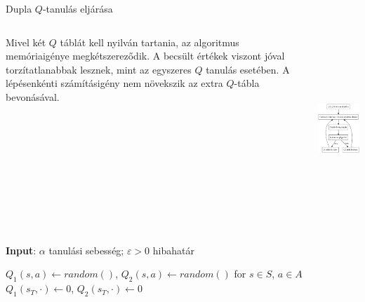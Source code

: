 \documentclass[english, aspectratio=169]{beamer}
\begin{document}
\begin{frame}{Dupla $Q$-tanulás eljárása}
\begin{columns}
\begin{column}{.5\textwidth}
Mivel két $Q$ táblát kell nyilván tartania, az algoritmus memóriaigénye megkétszereződik. A becsült értékek viszont jóval torzítatlanabbak lesznek, mint az egyszeres $Q$ tanulás esetében. A lépésenkénti számításigény nem növekszik az extra $Q$-tábla bevonásával.
\end{column}
\begin{column}{.5\textwidth}
\begin{center}
\includegraphics[height=7cm, keepaspectratio]{graphs/ql_2.png}
\end{center}
\end{column}
\end{columns}
\end{frame}

\begin{frame}{}
\begin{algorithm}[H]
\caption{Dupla $Q$-tanulás algoritmusa}
\SetAlgoLined
\begin{small}
\textbf{Input}: $\alpha$ tanulási sebesség; $\varepsilon > 0$ hibahatár\par
$Q_1(s,a) \leftarrow random()$, $Q_2(s,a) \leftarrow random()$ for $s \in S$, $a \in A$\;
$Q_1(s_T,\cdot) \leftarrow 0$, $Q_2(s_T,\cdot) \leftarrow 0$
\end{small}
\end{algorithm}
\end{frame}
\end{document}
